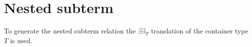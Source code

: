 \section{Nested subterm}

To generate the nested subterm relation the $\exists\exists_T$ translation of the container
type $T$ is used.
